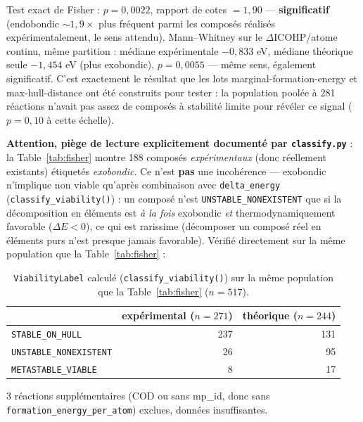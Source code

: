 \documentclass[11pt,a4paper]{article}
\begin{document}
Test exact de Fisher : $p=0,0022$, rapport de cotes $=1,90$ ---
\textbf{significatif} (endobondic $\sim1,9\times$ plus fréquent parmi
les composés réalisés expérimentalement, le sens attendu). Mann--Whitney
sur le $\Delta$ICOHP/atome continu, même partition : médiane
expérimentale $-0,833$ eV, médiane théorique seule $-1,454$ eV (plus
exobondic), $p=0,0055$ --- même sens, également significatif. C'est
exactement le résultat que les lots marginal-formation-energy et
max-hull-distance ont été construits pour tester : la population poolée
à 281 réactions n'avait pas assez de composés à stabilité limite pour
révéler ce signal ($p=0,10$ à cette échelle).

\textbf{Attention, piège de lecture explicitement documenté par
\texttt{classify.py}} : la Table~\ref{tab:fisher} montre 188 composés
\emph{expérimentaux} (donc réellement existants) étiquetés
\emph{exobondic}. Ce n'est \textbf{pas} une incohérence --- exobondic
n'implique \og{}non viable\fg{} qu'après combinaison avec
\texttt{delta\_energy} (\texttt{classify\_viability()}) : un composé
n'est \texttt{UNSTABLE\_NONEXISTENT} que si la décomposition en
éléments est \emph{à la fois} exobondic \emph{et} thermodynamiquement
favorable ($\Delta E<0$), ce qui est rarissime (décomposer un composé
réel en éléments purs n'est presque jamais favorable). Vérifié
directement sur la même population que la Table~\ref{tab:fisher} :

\begin{table}[htbp]
\centering
\caption{\texttt{ViabilityLabel} calculé (\texttt{classify\_viability()}) sur la même population que la Table~\ref{tab:fisher} ($n=517$).}
\label{tab:viability-check}
\begin{tabular}{@{}lrr@{}}
\toprule
 & expérimental ($n=271$) & théorique ($n=244$) \\
\midrule
\texttt{STABLE\_ON\_HULL}        & 237 & 131 \\
\texttt{UNSTABLE\_NONEXISTENT}   & 26  & 95 \\
\texttt{METASTABLE\_VIABLE}      & 8   & 17 \\
\bottomrule
\end{tabular}

\vspace{0.15cm}
{\footnotesize 3 réactions supplémentaires (COD ou sans mp\_id, donc
sans \texttt{formation\_energy\_per\_atom}) exclues, données
insuffisantes.}
\end{table}
\end{document}
